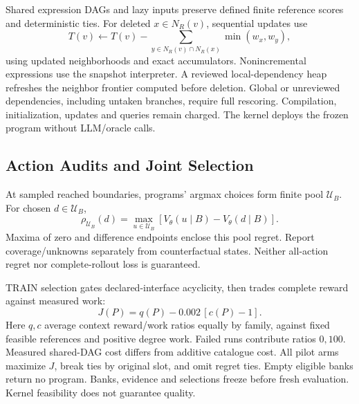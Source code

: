 Shared expression DAGs and lazy inputs preserve defined finite reference
scores and deterministic ties. For deleted $x\in N_R(v)$, sequential updates use
\begin{equation}
 T(v)\leftarrow T(v)-\sum_{y\in N_R(v)\cap N_R(x)}\min(w_x,w_y),
 \label{eq:incremental-feature}
\end{equation}
using updated neighborhoods and exact accumulators. Nonincremental expressions
use the snapshot interpreter. A reviewed local-dependency heap refreshes
the neighbor frontier computed before deletion. Global or unreviewed
dependencies, including untaken branches, require full rescoring.
Compilation, initialization, updates and queries remain charged.
The kernel deploys the frozen program without LLM/oracle calls.

\subsection{Action Audits and Joint Selection}
\label{sec:method:actions}
At sampled reached boundaries, programs' argmax choices form finite
pool $\mathcal U_B$. For chosen $d\in\mathcal U_B$,
\begin{equation}
 \rho_{\mathcal U_B}(d)=
 \max_{u\in\mathcal U_B}[V_\theta(u\mid B)-V_\theta(d\mid B)].
 \label{eq:pool-regret}
\end{equation}
Maxima of zero and difference endpoints enclose this pool regret.
Report coverage/unknowns separately from counterfactual states.
Neither all-action regret nor complete-rollout loss is guaranteed.

\label{sec:method:selection}
TRAIN selection gates declared-interface acyclicity, then trades
complete reward against measured work:
\begin{equation}
 J(P)=q(P)-0.002\,[c(P)-1].
 \label{eq:joint-utility}
\end{equation}
Here $q,c$ average context reward/work ratios equally by family, against
fixed feasible references and positive degree work. Failed runs contribute
ratios $0,100$.
Measured shared-DAG cost differs from additive catalogue cost.
All pilot arms maximize $J$, break ties by original slot, and omit regret ties.
Empty eligible banks return no program.
Banks, evidence and selections freeze before fresh evaluation.
Kernel feasibility does not guarantee quality.
